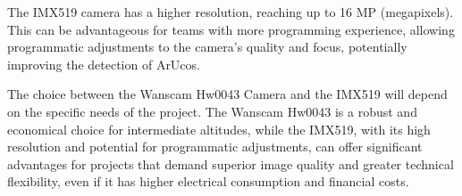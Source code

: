 \documentclass[letterpaper]{article}
\begin{document}
The IMX519 camera has a higher resolution, reaching up to 16 MP (megapixels). This can be advantageous for teams with more programming experience, allowing programmatic adjustments to the camera's quality and focus, potentially improving the detection of ArUcos.

The choice between the Wanscam Hw0043 Camera and the IMX519 will depend on the specific needs of the project. The Wanscam Hw0043 is a robust and economical choice for intermediate altitudes, while the IMX519, with its high resolution and potential for programmatic adjustments, can offer significant advantages for projects that demand superior image quality and greater technical flexibility, even if it has higher electrical consumption and financial costs.








\end{document}
